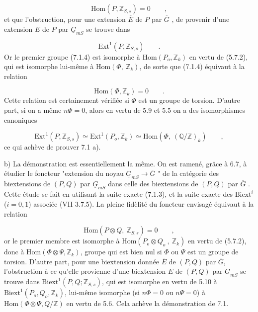 
\begin{equation}\tag{7.1.4}
 \mathrm{Hom}(P,\mathbb{Z}_{S,s}) = 0 \qquad ,
\end{equation}
et que l'obstruction, pour une extension $\overline{E}$ de $P$ par $\overline{G}$ , de provenir d'une extension $E$ de $P$ par $\underline{G}_{mS}$ se trouve dans

\begin{equation}\tag{7.1.5}
\mathrm{Ext}^1(P,\mathbb{Z}_{S,s}) \qquad .
\end{equation}
Or le premier groupe (7.1.4) est isomorphe à $\mathrm{Hom}(P_o,\mathbb{Z}_k)$ en vertu de (5.7.2), qui est isomorphe lui-même à $\mathrm{Hom}(\Phi,\ \mathbb{Z}_k)$, de sorte que (7.1.4) équivaut à la relation

\begin{equation}\tag{7.1.4 bis}
\mathrm{Hom}(\Phi,\mathbb{Z}_k) = 0 \qquad .
\end{equation}
Cette relation est certainement vérifiée si $\Phi$ est un groupe de torsion. D'autre part, si on a même $n\Phi = 0$, alors en vertu de 5.9 et 5.5 on a des isomorphismes canoniques

\begin{equation}\tag{7.1.6}
\mathrm{Ext}^1(P,\mathbb{Z}_{S,s}) \simeq \mathrm{Ext}^1(P_o,\mathbb{Z}_k) \simeq \mathrm{Hom}(\Phi,\ (\mathbb{Q}/\mathbb{Z})_k) \qquad ,
\end{equation}
ce qui achève de prouver 7.1 a).

b)  La démonstration est essentiellement la même. On est ramené, grâce à 6.7, à étudier le foncteur "extension du noyau $\underline{G}_{mS} \longrightarrow \overline{G}$ " de la catégorie des biextensions de $(P,Q)$ par $\underline{G}_{mS}$ dans celle des biextensions de $(P,Q)$ par $\overline{G}$ . Cette étude se fait en utilisant la suite exacte (7.1.3), et la suite exacte des $\mathrm{Biext}^i$ ($i=0,1$) associée (VII 3.7.5). La pleine fidèlité du foncteur envisagé équivaut à la relation

\begin{equation}\tag{7.1.7}
\mathrm{Hom}(P \otimes Q,\ \mathbb{Z}_{S,s}) = 0 \qquad ,
\end{equation}
or le premier membre est isomorphe à $\mathrm{Hom}(P_o \otimes Q_o\ ,\ \mathbb{Z}_k)$ en vertu de (5.7.2),
donc à $\mathrm{Hom}(\Phi \otimes \Psi, \mathbb{Z}_k)$, groupe qui est bien nul si $\Phi$ ou $\Psi$ est un groupe de torsion. D'autre part, pour une biextension donnée $\overline{E}$ de $(P,Q)$ par $\overline{G}$, l'obstruction à ce qu'elle provienne d'une biextension $E$ de $(P,Q)$ par $\underline{G}_{mS}$ se trouve dans $\mathrm{Biext}^1(P,Q;\mathbb{Z}_{S,s})$, qui est isomorphe en vertu de 5.10 à $\mathrm{Biext}^1(P_o,Q_o, \mathbb{Z}_k)$, lui-même isomorphe (si $n\Phi = 0$ ou $n\Psi = 0$) à $\mathrm{Hom}(\Phi \otimes \Psi, Q/\mathbb{Z})$ en vertu de 5.6. Cela achève la démonstration de 7.1.

